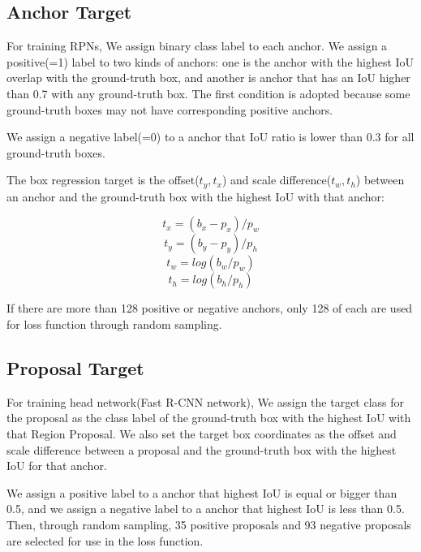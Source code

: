 \documentclass[extendedabs]{bmvc2k}
\begin{document}
\subsection{Anchor Target}
For training RPNs, We assign binary class label to each anchor. We assign a positive(=1) label to two kinds of anchors: one is the anchor with the highest IoU overlap with the ground-truth box, and another is anchor that has an IoU higher than 0.7 with any ground-truth box. The first condition is adopted because some ground-truth boxes may not have corresponding positive anchors. 

We assign a negative label(=0) to a anchor that IoU ratio is lower than 0.3 for all ground-truth boxes.

The box regression target is the offset($t_y,t_x$) and scale difference($t_w,t_h$) between an anchor and the ground-truth box with the highest IoU with that anchor:

$$
t_x = (b_x-p_x)/p_w
$$
$$
t_y = (b_y-p_y)/p_h
$$
$$
t_w = log(b_w/p_w)
$$
$$
t_h = log(b_h/p_h)
$$

If there are more than 128 positive or negative anchors, only 128 of each are used for loss function through random sampling.
\subsection{Proposal Target}
For training head network(Fast R-CNN network), We assign the target class for the proposal as the class label of the ground-truth box with the highest IoU with that Region Proposal. We also set the target box coordinates as the offset and scale difference between a proposal and the ground-truth box with the highest IoU for that anchor. 

We assign a positive label to a anchor that highest IoU is equal or bigger than 0.5, and we assign a negative label to a anchor that highest IoU is less than 0.5. Then, through random sampling, 35 positive proposals and 93 negative proposals are selected for use in the loss function.
\end{document}
